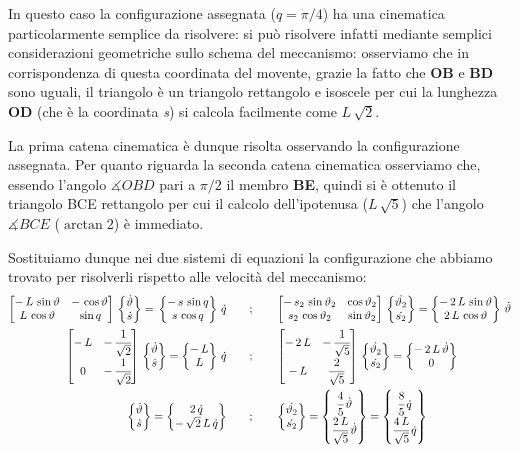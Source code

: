 In questo caso la configurazione assegnata ($q = \pi/4$) ha una cinematica particolarmente semplice da risolvere: si può risolvere infatti mediante semplici considerazioni geometriche sullo schema del meccanismo: osserviamo che in corrispondenza di questa coordinata del movente, grazie la fatto che \textbf{OB} e \textbf{BD} sono uguali, il triangolo è un triangolo rettangolo e isoscele per cui la lunghezza \textbf{OD} (che è la coordinata \emph{s}) si calcola facilmente come  $L\,\sqrt{2}$.

La prima catena cinematica è dunque risolta osservando la configurazione assegnata. Per quanto riguarda la seconda catena cinematica osserviamo che, essendo l'angolo $\measuredangle OBD$ pari a $\pi / 2$ il membro \textbf{BE}, quindi si è ottenuto il triangolo BCE rettangolo per cui il calcolo dell'ipotenusa ($L\,\sqrt{5}$) che l'angolo $\measuredangle BCE$ ($\arctan{2}$) è immediato.

Sostituiamo dunque nei due sistemi di equazioni la configurazione che abbiamo trovato per risolverli rispetto alle velocità del meccanismo:
\begin{align*}
\begin{bmatrix}-\,L\,\sin{\vartheta}&-\,\cos{\vartheta}\\L\,\cos{\vartheta}&\,\sin{q}\end{bmatrix}\,\begin{Bmatrix}\dot{\vartheta}\\\dot{s}\end{Bmatrix} = \,\begin{Bmatrix}-\,s\,\sin{q}\\s\,\cos{q}\end{Bmatrix}\,\dot{q}\qquad&;\qquad\begin{bmatrix}-\,s_2\,\sin{\vartheta_2}&\cos{\vartheta_2}\\s_2\,\cos{\vartheta_2}&\sin{\vartheta_2}\end{bmatrix}\,\begin{Bmatrix}\dot{\vartheta_2}\\\dot{s_2}\end{Bmatrix} = \begin{Bmatrix}-\,2\,L\,\sin{\vartheta}\\2\,L\,\cos{\vartheta}\end{Bmatrix}\,\dot{\vartheta}\\
\begin{bmatrix}-\,L &-\,\cfrac{1}{\sqrt{2}}\\0&-\,\cfrac{1}{\sqrt{2}}\end{bmatrix}\,\begin{Bmatrix}\dot{\vartheta}\\\dot{s}\end{Bmatrix} = \begin{Bmatrix}-\,L\\L\end{Bmatrix}\,\dot{q}\qquad&;\qquad\begin{bmatrix}-\,2\,L&-\,\cfrac{1}{\sqrt{5}}\\-\,L&\cfrac{2}{\sqrt{5}}\end{bmatrix}\,\begin{Bmatrix}\dot{\vartheta_2}\\\dot{s_2}\end{Bmatrix} = \begin{Bmatrix}-\,2\,L\,\dot{\vartheta}\\0\end{Bmatrix}\\
\begin{Bmatrix}\dot{\vartheta}\\\dot{s}\end{Bmatrix} = \begin{Bmatrix}2\,\dot{q}\\-\,\sqrt{2}\,L\,\dot{q}\end{Bmatrix}\qquad&;\qquad\begin{Bmatrix}\dot{\vartheta_2}\\\dot{s_2}\end{Bmatrix} = \begin{Bmatrix}\cfrac{4}{5}\,\dot{\vartheta}\\\cfrac{2\,L}{\sqrt{5}}\,\dot{\vartheta}\end{Bmatrix} = \begin{Bmatrix}\cfrac{8}{5}\,\dot{q}\\\cfrac{4\,L}{\sqrt{5}}\,\dot{q}\end{Bmatrix}
\end{align*}

